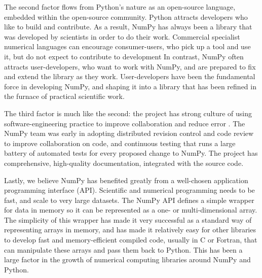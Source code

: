 The second factor flows from Python's nature as an open-source language,
embedded within the open-source community.  Python attracts developers who like
to build and contribute.  As a result, NumPy has always been a library that was
developed by scientists in order to do their work.  Commercial specialist
numerical languages can encourage consumer-users, who pick up a tool and use
it, but do not expect to contribute to development%
In contrast, NumPy often
attracts user-developers, who want to work with NumPy, and are prepared to fix
and extend the library as they work. User-developers have been the fundamental
force in developing NumPy, and shaping it into a library that has been refined
in the furnace of practical scientific work.

The third factor is much like the second: 
the project has strong culture of using software-engineering practice to
improve collaboration and reduce error \cite{millman2014developing}.
The NumPy team was early in adopting distributed
revision control and code review to improve collaboration on code, and
continuous testing that runs a large battery of automated tests for every proposed
change to NumPy.
The project has comprehensive, high-quality documentation,
integrated with the source
code\cite{vanderwalt2008scipy,harrington2008scipy,harrington2009scipy}. 

Lastly, we believe NumPy has benefited greatly from a well-chosen application
programming interface (API).  Scientific and numerical programming needs to be
fast, and scale to very large datasets.  The NumPy API defines a simple wrapper
for data in memory so it can be represented as a one- or multi-dimensional
array.  The simplicity of this wrapper has made it very successful as a
standard way of representing arrays in memory, and has made it relatively easy
for other libraries to develop fast and memory-efficient compiled code, usually
in C or Fortran, that can manipulate these arrays and pass them back to Python.
This has been a large factor in the growth of numerical computing libraries
around NumPy and Python.

